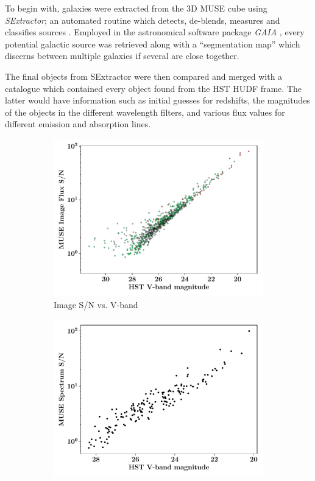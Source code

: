 \documentclass[12pt, twocolumn]{revtex4}    %
\begin{document}
To begin with, galaxies were extracted from the 3D MUSE cube using \textit{SExtractor}; an automated routine which detects, de-blends, measures and classifies sources \cite{bertin_sextractor}. Employed in the astronomical software package \textit{GAIA} \cite{currie_starlink}, every potential galactic source was retrieved along with a ``segmentation map'' which discerns between multiple galaxies if several are close together. 

The final objects from SExtractor were then compared and merged with a catalogue which contained every object found from the HST HUDF frame. The latter would have information such as initial guesses for redshifts, the magnitudes of the objects in the different wavelength filters, and various flux values for different emission and absorption lines.

\begin{figure}
  \begin{subfigure}[b]{0.495\textwidth}
    \includegraphics[width=\textwidth]{data/image_sn_vs_vband}
    \captionsetup{justification=justified}
    \caption{Image S/N vs. V-band}
    \label{fig:image_sn_vband}
  \end{subfigure}
  \begin{subfigure}[b]{0.495\textwidth}
    \includegraphics[width=\textwidth]{data/sn_vs_vband}

\end{subfigure}
\end{figure}
\end{document}
